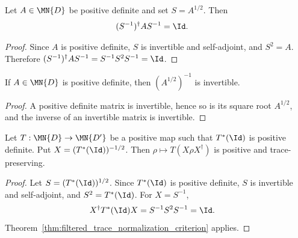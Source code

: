 \begin{lemma}
    \label{lem:conj_inv_sqrt_normalizes}
    \leanok
    \uses{}
    Let $A\in\MN{D}$ be positive definite and set $S=A^{1/2}$. Then
    \begin{align}
        (S^{-1})^\dagger A S^{-1}
         & =\Id.
        \notag
    \end{align}
\end{lemma}

\begin{proof}\leanok
    Since $A$ is positive definite, $S$ is invertible and self-adjoint, and
    $S^2=A$. Therefore
    $(S^{-1})^\dagger A S^{-1}=S^{-1}S^2S^{-1}=\Id$.
\end{proof}

\begin{lemma}
    \label{lem:pos_def_inv_sqrt_invertible}
    \leanok
    \uses{}
    If $A\in\MN{D}$ is positive definite, then $(A^{1/2})^{-1}$ is
    invertible.
\end{lemma}

\begin{proof}\leanok
    A positive definite matrix is invertible, hence so is its square root
    $A^{1/2}$, and the inverse of an invertible matrix is invertible.
\end{proof}

\begin{theorem}
    \label{thm:trace_normalization_inverse_square_root}
    \leanok
    Let $T:\MN{D}\to\MN{D'}$ be a positive map such that $T^*(\Id)$ is positive
    definite. Put $X=(T^*(\Id))^{-1/2}$. Then
    $\rho\mapsto T(X\rho X^\dagger)$ is positive and trace-preserving.
\end{theorem}

\begin{proof}\leanok
    Let $S=(T^*(\Id))^{1/2}$. Since $T^*(\Id)$ is positive definite, $S$ is
    invertible and self-adjoint, and $S^2=T^*(\Id)$. For $X=S^{-1}$,
    \begin{align}
        X^\dagger T^*(\Id)X
         & =S^{-1}S^2S^{-1}=\Id.
        \notag
    \end{align}
    Theorem~\ref{thm:filtered_trace_normalization_criterion} applies.
\end{proof}

